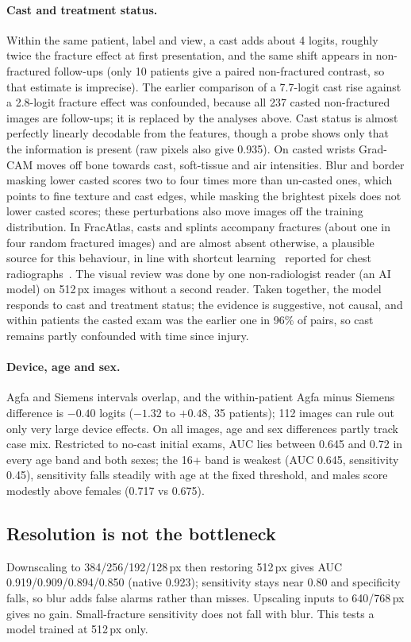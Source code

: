 \documentclass[11pt]{article}
\begin{document}
\paragraph{Cast and treatment status.} Within the same patient, label and view, a cast adds about 4 logits, roughly twice the fracture effect at first presentation, and the same shift appears in non-fractured follow-ups (only 10 patients give a paired non-fractured contrast, so that estimate is imprecise). The earlier comparison of a 7.7-logit cast rise against a 2.8-logit fracture effect was confounded, because all 237 casted non-fractured images are follow-ups; it is replaced by the analyses above. Cast status is almost perfectly linearly decodable from the features, though a probe shows only that the information is present (raw pixels also give 0.935). On casted wrists Grad-CAM moves off bone towards cast, soft-tissue and air intensities. Blur and border masking lower casted scores two to four times more than un-casted ones, which points to fine texture and cast edges, while masking the brightest pixels does not lower casted scores; these perturbations also move images off the training distribution. In FracAtlas, casts and splints accompany fractures (about one in four random fractured images) and are almost absent otherwise, a plausible source for this behaviour, in line with shortcut learning~\cite{Geirhos_2020} reported for chest radiographs~\cite{Zech_2018}. The visual review was done by one non-radiologist reader (an AI model) on 512\,px images without a second reader. Taken together, the model responds to cast and treatment status; the evidence is suggestive, not causal, and within patients the casted exam was the earlier one in 96\% of pairs, so cast remains partly confounded with time since injury.
\paragraph{Device, age and sex.} Agfa and Siemens intervals overlap, and the within-patient Agfa minus Siemens difference is $-0.40$ logits ($-1.32$ to $+0.48$, 35 patients); 112 images can rule out only very large device effects. On all images, age and sex differences partly track case mix. Restricted to no-cast initial exams, AUC lies between 0.645 and 0.72 in every age band and both sexes; the 16+ band is weakest (AUC 0.645, sensitivity 0.45), sensitivity falls steadily with age at the fixed threshold, and males score modestly above females (0.717 vs 0.675).

\subsection{Resolution is not the bottleneck}
Downscaling to 384/256/192/128\,px then restoring 512\,px gives AUC 0.919/0.909/0.894/0.850 (native 0.923); sensitivity stays near 0.80 and specificity falls, so blur adds false alarms rather than misses. Upscaling inputs to 640/768\,px gives no gain. Small-fracture sensitivity does not fall with blur. This tests a model trained at 512\,px only.
\end{document}
